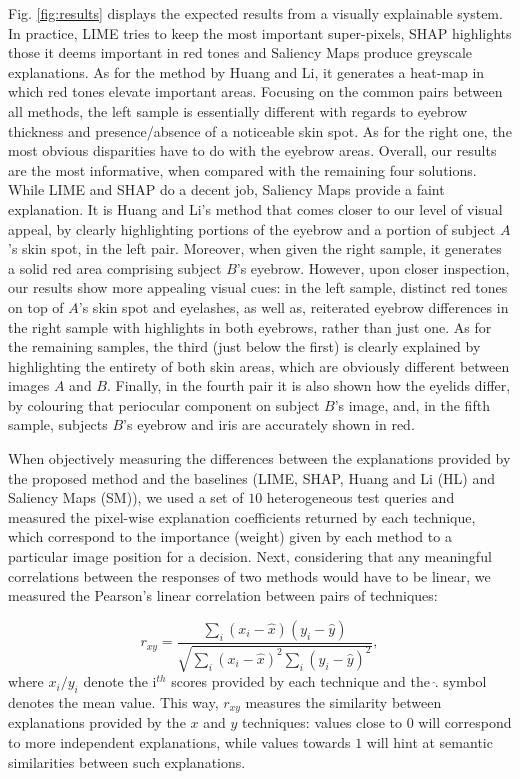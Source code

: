 \documentclass[final]{cvpr}
\begin{document}
Fig. \ref{fig:results} displays the expected results from a visually explainable system. In practice, LIME tries to keep the most important super-pixels, SHAP highlights those it deems important in red tones and Saliency Maps produce greyscale explanations. As for the method by Huang and Li, it generates a heat-map in which red tones elevate important areas. Focusing on the common pairs between all methods, the left sample is essentially different with regards to eyebrow thickness and presence/absence of a noticeable skin spot. As for the right one, the most obvious disparities have to do with the eyebrow areas. Overall, our results are the most informative, when compared with the remaining four solutions. While LIME and SHAP do a decent job, Saliency Maps provide a faint explanation. It is Huang and Li's method that comes closer to our level of visual appeal, by clearly highlighting portions of the eyebrow and a portion of subject $A$'s skin spot, in the left pair. Moreover, when given the right sample, it generates a solid red area comprising subject $B$'s eyebrow. However, upon closer inspection, our results show more appealing visual cues: in the left sample, distinct red tones on top of $A$'s skin spot and eyelashes, as well as, reiterated eyebrow differences in the right sample with highlights in both eyebrows, rather than just one. As for the remaining samples, the third (just below the first) is clearly explained by highlighting the entirety of both skin areas, which are obviously different between images $A$ and $B$. Finally, in the fourth pair it is also shown how the eyelids differ, by colouring that periocular component on subject $B$'s image, and, in the fifth sample, subjects $B$'s eyebrow and iris are accurately shown in red.

When objectively measuring the differences between the explanations provided by the proposed method and the baselines (LIME, SHAP, Huang and Li (HL) and  Saliency Maps (SM)), we used a set of $10$ heterogeneous test queries and measured the pixel-wise explanation coefficients returned by each technique, which correspond to the importance (weight) given by each method to a particular image position for a decision. Next, considering that any meaningful correlations between the responses of two methods would have to be linear, we measured the Pearson's linear correlation between pairs of techniques:

\begin{equation}
    r_{xy} = \frac{\sum_i (x_i - \hat{x}) (y_i -\hat{y})}{\sqrt{\sum_i (x_i -\hat{x})^2 \sum_i (y_i -\hat{y})^2}},
\label{eq:neighbour_score}
\end{equation}
where $x_i/y_i$ denote the i$^{th}$ scores provided by each technique and the $\hat{.}$ symbol denotes the mean value. This way, $r_{xy}$ measures the similarity between explanations provided by the $x$ and $y$ techniques: values close to $0$ will correspond to more independent explanations, while values towards $1$ will hint at semantic similarities between such explanations.
\end{document}
